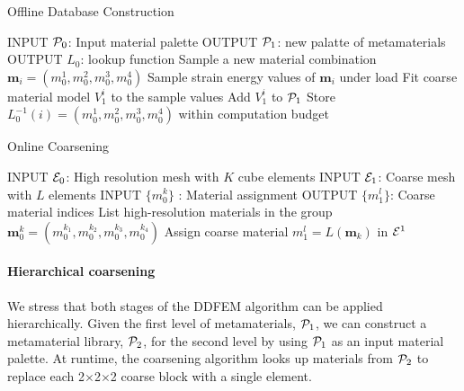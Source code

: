 \begin{algorithm}
	\caption{Offline Database Construction}\label{alg:offline}
	\begin{algorithmic}[1]
		\State INPUT $\mathcal{P}_0$: Input material palette
		\State OUTPUT $\mathcal{P}_1$: new palatte of metamaterials
		\State OUTPUT $L_0$: lookup function
        \Do
		\State Sample a new material combination $\mathbf{m}_i=(m_0^1,m_0^2,m_0^3,m_0^4)$
		\State Sample strain energy values of $\mathbf{m}_i$ under load
		\State Fit coarse material model $V_1^i$ to the sample values
		\State Add $V_1^i$ to $\mathcal{P}_1$
		\State Store $L_0^{-1}(i) = (m_0^1,m_0^2,m_0^3,m_0^4)$
		\doWhile within computation budget
		\EndProcedure
	\end{algorithmic}
\end{algorithm}
\begin{algorithm}
	\caption{Online Coarsening}\label{alg:online}
	\begin{algorithmic}[1]
		\State INPUT $\mathcal{E}_0$: High resolution mesh with $K$ cube elements
		\State INPUT $\mathcal{E}_1$: Coarse mesh with $L$ elements		
		\State INPUT $\{m_0^k\}$ : Material assignment
		\State OUTPUT $\{m_1^l\}$: Coarse material indices
		  \State List high-resolution materials in the group 
		  \State $\mathbf{m}_0^k = (m_0^{k_1},m_0^{k_2},m_0^{k_3},m_0^{k_4})$
		  \State Assign coarse material $m_1^l = L(\mathbf{m}_k)$ in $\mathcal{E}^1$
		\EndFor
		\EndProcedure
	\end{algorithmic}
\end{algorithm}

\paragraph{Hierarchical coarsening}
We stress that both stages of the DDFEM algorithm can be applied hierarchically. Given the first level of metamaterials, $\mathcal{P}_1$, we can construct a metamaterial library, $\mathcal{P}_2$, for the second level by using $\mathcal{P}_1$ as an input material palette. At runtime, the coarsening algorithm looks up materials from $\mathcal{P}_2$ to replace each 2$\times$2$\times$2 coarse block with a single element.
